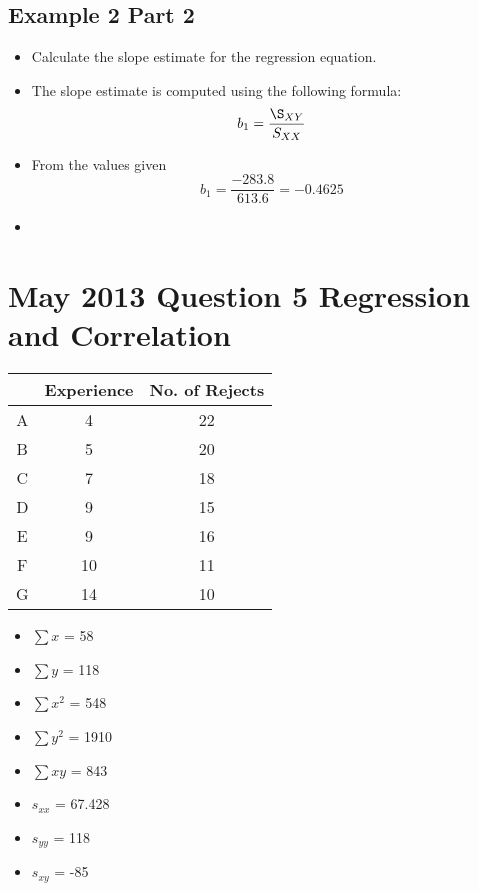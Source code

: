 \documentclass[]{report}
\begin{document}
\subsection{Example 2 Part 2}
\begin{itemize}
	\item Calculate the slope estimate for the regression equation.
	\item The slope estimate is computed using the following formula:
	\[ b_1 = \frac{\S_{XY}}{S_{XX}} \]
	\item From the values given
	\[ b_1 = \frac{-283.8}{613.6} =-0.4625 \]
	\item 
\end{itemize}



\section*{May 2013 Question 5 Regression and Correlation}
\begin{center}
	\begin{tabular}{|c|c|c|}
		\hline  & Experience & No. of Rejects \\ 
		\hline A & 4 & 22 \\ 
		\hline B & 5 & 20 \\ 
		\hline C & 7 & 18 \\ 
		\hline D & 9 & 15 \\ 
		\hline E & 9 & 16 \\ 
		\hline F & 10 & 11 \\ 
		\hline G & 14 & 10 \\ 
		\hline 
	\end{tabular} 
\end{center}

\begin{itemize}
	\item $\sum x$ = 58
	\item $\sum y$ = 118
	\item $\sum x^2$ = 548
	\item $\sum y^2$ = 1910
	\item $\sum xy$ = 843
\end{itemize}

\begin{itemize}
	\item $s_{xx}$ = 67.428
	\item $s_{yy}$ = 118
	\item $s_{xy}$ = -85
\end{itemize}
\end{document}
